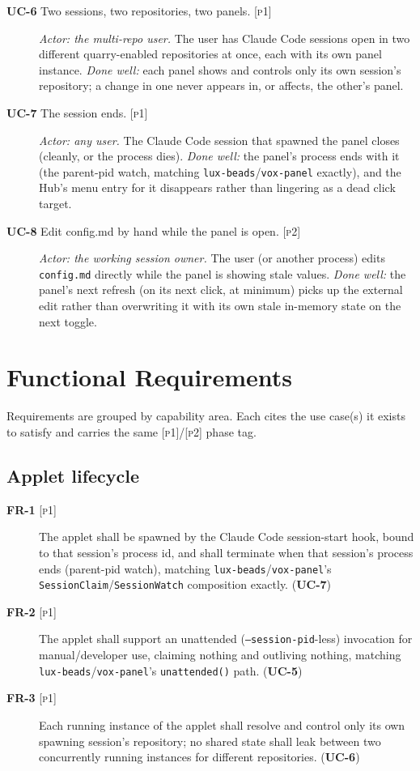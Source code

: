 \documentclass[a4paper,11pt]{report}
\newcommand{\uc}[1]{\textbf{UC-#1}}
\newcommand{\fr}[1]{\textbf{FR-#1}}
\newcommand{\pone}{\textsc{[p1]}}
\newcommand{\ptwo}{\textsc{[p2]}}
\begin{document}
\begin{description}
\item[\uc{6} Two sessions, two repositories, two panels. \pone{}]
  \emph{Actor: the multi-repo user.} The user has Claude Code sessions
  open in two different quarry-enabled repositories at once, each with
  its own panel instance. \emph{Done well:} each panel shows and controls
  only its own session's repository; a change in one never appears in,
  or affects, the other's panel.

\item[\uc{7} The session ends. \pone{}] \emph{Actor: any user.} The
  Claude Code session that spawned the panel closes (cleanly, or the
  process dies). \emph{Done well:} the panel's process ends with it (the
  parent-pid watch, matching \texttt{lux-beads}/\texttt{vox-panel}
  exactly), and the Hub's menu entry for it disappears rather than
  lingering as a dead click target.

\item[\uc{8} Edit config.md by hand while the panel is open. \ptwo{}]
  \emph{Actor: the working session owner.} The user (or another process)
  edits \texttt{config.md} directly while the panel is showing stale
  values. \emph{Done well:} the panel's next refresh (on its next click,
  at minimum) picks up the external edit rather than overwriting it with
  its own stale in-memory state on the next toggle.

\end{description}

\section{Functional Requirements}
\label{sec:fr}

Requirements are grouped by capability area. Each cites the use case(s) it
exists to satisfy and carries the same \pone{}/\ptwo{} phase tag.

\subsection{Applet lifecycle}

\begin{description}
  \item[\fr{1} \pone{}] The applet shall be spawned by the Claude Code
    session-start hook, bound to that session's process id, and shall
    terminate when that session's process ends (parent-pid watch),
    matching \texttt{lux-beads}/\texttt{vox-panel}'s
    \texttt{SessionClaim}/\texttt{SessionWatch} composition exactly.
    (\uc{7})
  \item[\fr{2} \pone{}] The applet shall support an unattended
    (\texttt{--session-pid}-less) invocation for manual/developer use,
    claiming nothing and outliving nothing, matching
    \texttt{lux-beads}/\texttt{vox-panel}'s \texttt{unattended()} path.
    (\uc{5})
  \item[\fr{3} \pone{}] Each running instance of the applet shall resolve
    and control only its own spawning session's repository; no shared
    state shall leak between two concurrently running instances for
    different repositories. (\uc{6})
\end{description}
\end{document}

